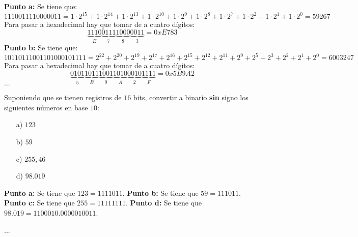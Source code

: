 \begin{solution}
    \textbf{Punto a:} Se tiene que:
    \begin{equation*}
        1110011110000011 = 1 \cdot 2^{15} + 1 \cdot 2^{14} + 1 \cdot 2^{13} + 1 \cdot 2^{10} + 1 \cdot 2^9 + 1 \cdot 2^8 + 1 \cdot 2^7 + 1 \cdot 2^2 + 1 \cdot 2^1 + 1 \cdot 2^0 = 59267
    \end{equation*}
    Para pasar a hexadecimal hay que tomar de a cuatro dígitos:
    \begin{equation*}
        \underbrace{1110}_{E} \underbrace{0111}_{7} \underbrace{1000}_{8} \underbrace{0011}_{3} = 0xE783
    \end{equation*}
    \textbf{Punto b:} Se tiene que:
    \begin{equation*}
        10110111001101000101111 = 2^{22} + 2^{20} + 2^{19} + 2^{17} + 2^{16} + 2^{15} + 2^{12} + 2^{11} + 2^{9} + 2^{5} + 2^{3} + 2^{2} + 2^{1} + 2^{0} = 6003247 
    \end{equation*}
    Para pasar a hexadecimal hay que tomar de a cuatro dígitos:
    \begin{equation*}
        \underbrace{0101}_{5} \underbrace{1011}_{B} \underbrace{1001}_{9} \underbrace{1010}_{A} \underbrace{0010}_{2} \underbrace{1111}_{F} = 0x5B9A2
    \end{equation*}
    $\dots$
\end{solution}

\begin{ejer}
    Suponiendo que se tienen registros de $16$ bits, convertir a binario \textbf{sin} signo los siguientes números en base $10$:
    \begin{itemize}
        \item[a)] $123$
        \item[b)] $59$
        \item[c)] $255,46$
        \item[d)] $98.019$
    \end{itemize}
\end{ejer}

\begin{solution}
    \textbf{Punto a:} Se tiene que $123 = 1111011$.
    \textbf{Punto b:} Se tiene que $59 = 111011$.
    \textbf{Punto c:} Se tiene que $255 = 11111111$.
    \textbf{Punto d:} Se tiene que $98.019 = 1100010.0000010011$.
\end{solution}

...
